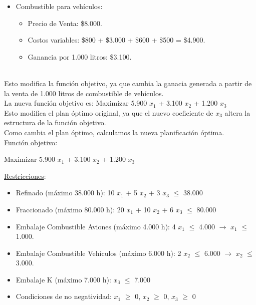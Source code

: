 \documentclass[10pt,a4paper]{article}
\begin{document}
\begin{enumerate}[label=\textbf{\sffamily\large\arabic*.}]
    \begin{itemize}

        \item Combustible para vehículos:
        \begin{itemize}

            \item Precio de Venta: \$8.000.
            \item Costos variables: \$800 + \$3.000 + \$600 + \$500 = \$4.900.
            \item Ganancia por 1.000 litros: \$3.100. \\
    
        \end{itemize}
    \end{itemize}
    \\
     Esto modifica la función objetivo, ya que cambia la ganacia generada a partir de la venta de 1.000 litros de combustible de vehículos. \\ 
    La nueva función objetivo es: Maximizar 5.900 $x_{1}$ + 3.100 $x_{2}$ + 1.200 $x_{3}$ \\

    Esto modifica el plan óptimo original, ya que el nuevo coeficiente de $x_{3}$ altera la estructura de la función objetivo. \\
    Como cambia el plan óptimo, calculamos la nueva planificación óptima. \\

    \underline{Función objetivo}: 

    \begin{center}
        
        Maximizar 5.900 $x_{1}$ + 3.100 $x_{2}$ + 1.200 $x_{3}$

    \end{center}

    \clearpage

    \underline{Restricciones}: 

    \begin{itemize}

        \item Refinado (máximo 38.000 h): 10 $x_{1}$ + 5 $x_{2}$ + 3 $x_{3}$ $\leq$ 38.000
        \item Fraccionado (máximo 80.000 h): 20 $x_{1}$ + 10 $x_{2}$ + 6 $x_{3}$ $\leq$ 80.000
        \item Embalaje Combustible Aviones (máximo 4.000 h): 4 $x_{1}$ $\leq$ 4.000 $\rightarrow$ $x_{1}$ $\leq$ 1.000.
        \item Embalaje Combustible Vehículos (máximo 6.000 h): 2 $x_{2}$ $\leq$ 6.000 $\rightarrow$ $x_{2}$ $\leq$ 3.000.
        \item Embalaje K (máximo 7.000 h): $x_{3}$ $\leq$ 7.000
        \item Condiciones de no negatividad: $x_{1}$ $\geq$ 0, $x_{2}$ $\geq$ 0, $x_{3}$ $\geq$ 0\\


\end{itemize}
\end{enumerate}
\end{document}
